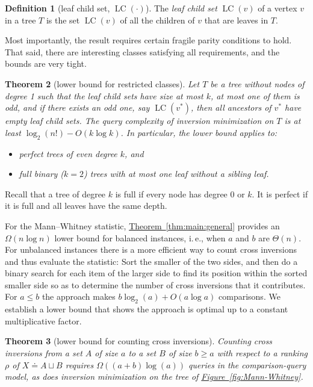 \documentclass[11pt]{article}
\numberwithin{equation}{section}
\newtheorem{theorem}{Theorem}[section]
\theoremstyle{definition}
\newtheorem{definition}[theorem]{Definition}
\theoremstyle{plain}
\newcommand{\ie}{i.\,e.}
\newcommand{\expref}[2]{\hyperref[#2]{#1~\ref{#2}}}
\DeclareMathOperator{\leafchildset}{LC}
\newcommand{\ranking}{\rho}
\begin{document}
\begin{definition}[leaf child set, $\leafchildset(\cdot)$]\label{def:leaf-child-set} The \emph{leaf child set} $\leafchildset(v)$ of a vertex $v$ in a tree $T$ is the set $\leafchildset(v)$ of all the children of $v$ that are leaves in $T$.
\end{definition}
Most importantly, the result requires certain fragile parity conditions to hold. That said, there are interesting classes satisfying all requirements, and the bounds are very tight. 
\begin{theorem}[lower bound for restricted classes]\label{thm:main:special}
Let $T$ be a tree without nodes of degree 1 such that the leaf child sets have size at most $k$, at most one of them is odd, and if there exists an odd one, say $\leafchildset(v^*)$, then all ancestors of $v^*$ have empty leaf child sets. The query complexity of inversion minimization on $T$ is at least $\log_2(n!) - O(k \log k)$. In particular, the lower bound applies to:
\begin{itemize}
\item perfect trees of even degree $k$, and
\item full binary ($k=2$) trees with at most one leaf without a sibling leaf.
\end{itemize}
\end{theorem}
Recall that a tree of degree $k$ is full if every node has degree 0 or $k$. It is perfect if it is full and all leaves have the same depth.

For the Mann--Whitney statistic, \expref{Theorem}{thm:main:general} provides an $\Omega(n \log n)$ lower bound for balanced instances, \ie, when $a$ and $b$ are $\Theta(n)$. For unbalanced instances there is a more efficient way to count cross inversions and thus evaluate the statistic: Sort the smaller of the two sides, and then do a binary search for each item of the larger side to find its position within the sorted smaller side so as to determine the number of cross inversions that it contributes. For $a \le b$ the approach makes $b \log_2(a) + O(a \log a)$ comparisons. We establish a lower bound that shows the approach is optimal up to a constant multiplicative factor.
\begin{theorem}[lower bound for counting cross inversions]\label{thm:Mann-Whitney}
Counting cross inversions from a set $A$ of size $a$ to a set $B$ of size $b \ge a$ with respect to a ranking $\ranking$ of $X \doteq A \sqcup B$ requires $\Omega((a+b)\log(a))$ queries in the comparison-query model, as does inversion minimization on the tree of \expref{Figure}{fig:Mann-Whitney}.
\end{theorem}
\end{document}
